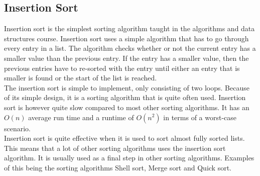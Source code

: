 \subsection{Insertion Sort}
Insertion sort is the simplest sorting algorithm taught in the algorithms and data structures course. Insertion sort uses a simple algorithm that has to go through every entry in a list. The algorithm checks whether or not the current entry has a smaller value than the previous entry. If the entry has a smaller value, then the previous entries have to re-sorted with the entry until either an entry that is smaller is found or the start of the list is reached.
\\[11pt]
The insertion sort is simple to implement, only consisting of two loops. Because of its simple design, it is a sorting algorithm that is quite often used. Insertion sort is however quite slow compared to most other sorting algorithms. It has an $O(n)$ average run time and a runtime of $O(n^2)$ in terms of a worst-case scenario.
\\[11pt]
Insertion sort is quite effective when it is used to sort almost fully sorted lists. This means that a lot of other sorting algorithms uses the insertion sort algorithm. It is usually used as a final step in other sorting algorithms. Examples of this being the sorting algorithms Shell sort, Merge sort and Quick sort.